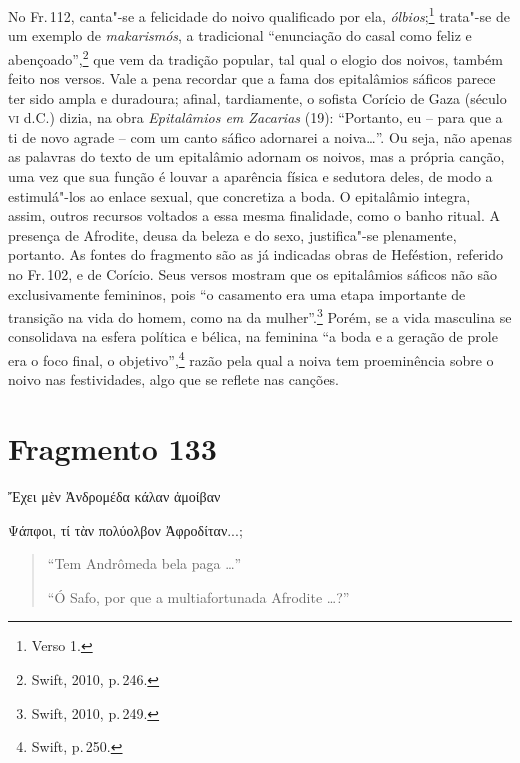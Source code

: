 No Fr.\,112, canta"-se a felicidade do noivo qualificado por ela, \textit{ólbios};\footnote{Verso 1.} trata"-se de um exemplo de \textit{makarismós}, a tradicional ``enunciação do casal como feliz e abençoado'',\footnote{Swift, 2010, p.\,246.} que vem da tradição popular, tal qual o elogio dos noivos, também feito nos versos.
Vale a pena recordar que a fama dos epitalâmios sáficos parece ter
sido ampla e duradoura; afinal, tardiamente, o sofista Corício de Gaza (século
\textsc{vi} d.C.) dizia, na obra \textit{Epitalâmios em Zacarias} (19): ``Portanto, eu
-- para que a ti de novo agrade -- com um canto sáfico adornarei a noiva\ldots{}''.
Ou seja, não apenas as palavras do texto de um epitalâmio adornam os noivos,
mas a própria canção, uma vez que sua função é louvar a aparência física e
sedutora deles, de modo a estimulá"-los ao enlace sexual, que concretiza a
boda. O epitalâmio integra, assim, outros recursos voltados a essa mesma finalidade,
como o banho ritual. A presença de Afrodite, deusa da beleza e do sexo,
justifica"-se plenamente, portanto. As fontes do fragmento são as já indicadas
obras de Heféstion, referido no Fr.\,102, e de Corício.
Seus versos mostram que os epitalâmios sáficos não são exclusivamente femininos, pois ``o casamento era uma etapa importante de transição na vida do homem, como na da mulher''.\footnote{Swift, 2010, p.\,249.} Porém, se a vida masculina se consolidava na esfera política e bélica, na feminina  ``a boda e a geração de prole era o foco final, o objetivo'',\footnote{Swift, p.\,250.} razão pela qual a noiva tem proeminência sobre o noivo nas festividades, algo que se reflete nas canções.

\pagebreak

\section{Fragmento 133}

\begin{gkverse}
Ἔχει μὲν Ἀνδρομέδα κάλαν ἀμοίβαν

\hspace*{21mm}

Ψάπφοι, τί τὰν πολύολβον Ἀφροδίταν...;
\end{gkverse}

\begin{verse}
``Tem Andrômeda bela paga \ldots{}''

\hspace*{21mm}

``Ó Safo, por que a multiafortunada Afrodite \ldots{}?''
\end{verse}

